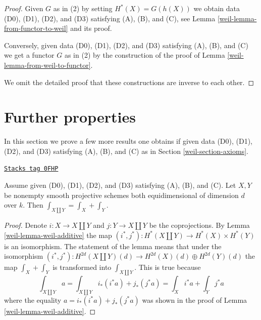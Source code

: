 \begin{proof}

Given $G$ as in (2) by setting $H^*(X) = G(h(X))$ we obtain data
(D0), (D1), (D2), and (D3) satisfying (A), (B), and (C),
see Lemma \ref{weil-lemma-from-functor-to-weil} and its proof.

\medskip\noindent
Conversely, given data (D0), (D1), (D2), and (D3)
satisfying (A), (B), and (C) we get a functor $G$ as in (2)
by the construction of the proof of Lemma \ref{weil-lemma-from-weil-to-functor}.

\medskip\noindent
We omit the detailed proof that these constructions are inverse
to each other.
\end{proof}

\section{Further properties}
\label{weil-section-further}
In this section we prove a few more results one obtains if
given data (D0), (D1), (D2), and (D3) satisfying (A), (B), and (C) as in
Section \ref{weil-section-axioms}.

\begin{lemma}
\label{weil-lemma-trace-disjoint-union}
\href{https://stacks.math.columbia.edu/tag/0FHP}{\texttt{Stacks tag 0FHP}}

Assume given (D0), (D1), (D2), and (D3) satisfying (A), (B), and (C).
Let $X, Y$ be nonempty smooth projective schemes both equidimensional
of dimension $d$ over $k$. Then $\int_{X \amalg Y} = \int_X + \int_Y$.
\end{lemma}

\begin{proof}

Denote $i : X \to X \amalg Y$ and $j : Y \to X \amalg Y$ be the coprojections.
By Lemma \ref{weil-lemma-weil-additive} the map
$(i^*, j^*) : H^*(X \amalg Y) \to H^*(X) \times H^*(Y)$ is an isomorphism.
The statement of the lemma means that under the isomorphism
$(i^*, j^*) : H^{2d}(X \amalg Y)(d) \to H^{2d}(X)(d) \oplus H^{2d}(Y)(d)$
the map $\int_X + \int_Y$ is transformed into $\int_{X \amalg Y}$.
This is true because
$$
\int_{X \amalg Y} a =
\int_{X \amalg Y} i_*(i^*a) + j_*(j^*a) =
\int_X i^*a + \int_Y j^*a
$$
where the equality $a = i_*(i^*a) + j_*(j^*a)$ was shown in
the proof of Lemma \ref{weil-lemma-weil-additive}.
\end{proof}

